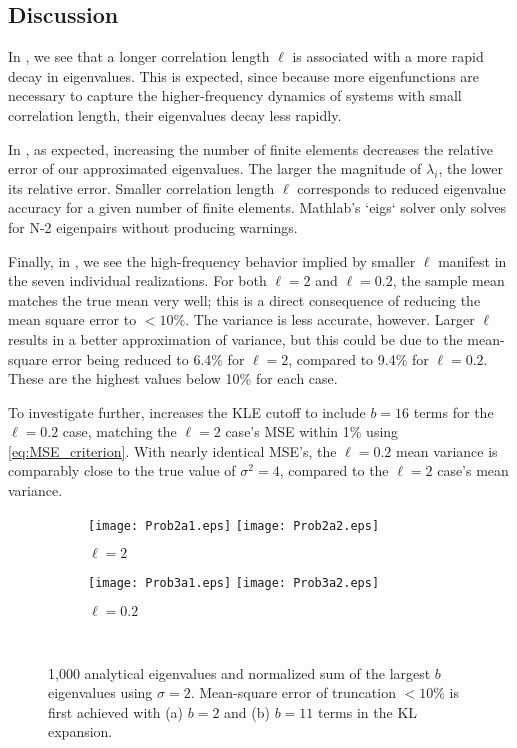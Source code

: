 \documentclass[11pt]{article}
\begin{document}
\subsection*{Discussion}

In , we see that a longer correlation length $\ell$ is associated with a more rapid decay in eigenvalues. This is expected, since because more eigenfunctions are necessary to capture the higher-frequency dynamics of systems with small correlation length, their eigenvalues decay less rapidly.

In , as expected, increasing the number of finite elements decreases the relative error of our approximated eigenvalues. The larger the magnitude of $\lambda_i$, the lower its relative error. Smaller correlation length $\ell$ corresponds to reduced eigenvalue accuracy for a given number of finite elements. Mathlab's `eigs` solver only solves for N-2 eigenpairs without producing warnings.

Finally, in , we see the high-frequency behavior implied by smaller $\ell$ manifest in the seven individual realizations. For both $\ell=2$ and $\ell=0.2$, the sample mean matches the true mean very well; this is a direct consequence of reducing the mean square error to $<10\%$. The variance is less accurate, however. Larger $\ell$ results in a better approximation of variance, but this could be due to the mean-square error being reduced to 6.4\% for $\ell=2$, compared to 9.4\% for $\ell=0.2$. These are the highest values below 10\% for each case.

To investigate further,  increases the KLE cutoff to include $b=16$ terms for the $\ell=0.2$ case, matching the $\ell=2$ case's MSE within 1\% using \eqref{eq:MSE_criterion}. With nearly identical MSE's, the $\ell=0.2$ mean variance is comparably close to the true value of $\sigma^2 = 4$, compared to the $\ell=2$ case's mean variance.

\begin{figure}[p]
\centering
\begin{subfigure}{0.49\textwidth}
\texttt{[image: Prob2a1.eps]}
\texttt{[image: Prob2a2.eps]}
\caption{$\ell=2$}
\end{subfigure}
\begin{subfigure}{0.49\textwidth}
\texttt{[image: Prob3a1.eps]}
\texttt{[image: Prob3a2.eps]}
\caption{$\ell=0.2$}
\end{subfigure}
\\[0.2cm]
\caption{1,000 analytical eigenvalues and normalized sum of the largest $b$ eigenvalues using $\sigma = 2$. Mean-square error of truncation $<10\%$ is first achieved with (a) $b=2$ and (b) $b=11$ terms in the KL expansion.}
\label{fig:analytical_eigs}
\end{figure}
\end{document}
